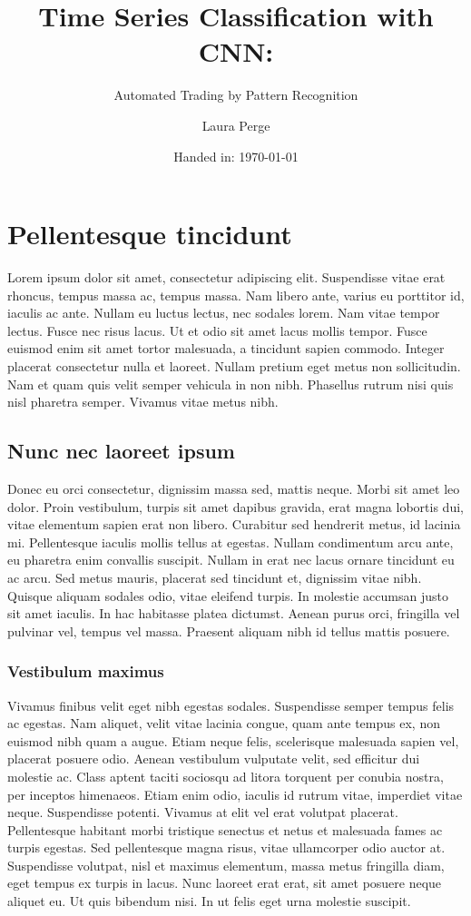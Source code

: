 \documentclass[11pt, a4paper]{article}
\author{Laura Perge}
\title{Time Series Classification with CNN:}
\subtitle{ Automated Trading by Pattern Recognition} %
\date{Handed in: \today}
\begin{document}
\maketitle

\tableofcontents

\section{Pellentesque tincidunt}
Lorem ipsum dolor sit amet, consectetur adipiscing elit. Suspendisse vitae erat rhoncus, tempus massa ac, tempus massa. Nam libero ante, varius eu porttitor id, iaculis ac ante. Nullam eu luctus lectus, nec sodales lorem. Nam vitae tempor lectus. Fusce nec risus lacus. Ut et odio sit amet lacus mollis tempor. Fusce euismod enim sit amet tortor malesuada, a tincidunt sapien commodo. Integer placerat consectetur nulla et laoreet. Nullam pretium eget metus non sollicitudin. Nam et quam quis velit semper vehicula in non nibh. Phasellus rutrum nisi quis nisl pharetra semper. Vivamus vitae metus nibh.

\subsection{Nunc nec laoreet ipsum}
Donec eu orci consectetur, dignissim massa sed, mattis neque. Morbi sit amet leo dolor. Proin vestibulum, turpis sit amet dapibus gravida, erat magna lobortis dui, vitae elementum sapien erat non libero. Curabitur sed hendrerit metus, id lacinia mi. Pellentesque iaculis mollis tellus at egestas. Nullam condimentum arcu ante, eu pharetra enim convallis suscipit. Nullam in erat nec lacus ornare tincidunt eu ac arcu. Sed metus mauris, placerat sed tincidunt et, dignissim vitae nibh. Quisque aliquam sodales odio, vitae eleifend turpis. In molestie accumsan justo sit amet iaculis. In hac habitasse platea dictumst. Aenean purus orci, fringilla vel pulvinar vel, tempus vel massa. Praesent aliquam nibh id tellus mattis posuere.

\subsubsection{Vestibulum maximus}
Vivamus finibus velit eget nibh egestas sodales. Suspendisse semper tempus felis ac egestas. Nam aliquet, velit vitae lacinia congue, quam ante tempus ex, non euismod nibh quam a augue. Etiam neque felis, scelerisque malesuada sapien vel, placerat posuere odio. Aenean vestibulum vulputate velit, sed efficitur dui molestie ac. Class aptent taciti sociosqu ad litora torquent per conubia nostra, per inceptos himenaeos. Etiam enim odio, iaculis id rutrum vitae, imperdiet vitae neque. Suspendisse potenti. Vivamus at elit vel erat volutpat placerat. Pellentesque habitant morbi tristique senectus et netus et malesuada fames ac turpis egestas. Sed pellentesque magna risus, vitae ullamcorper odio auctor at. Suspendisse volutpat, nisl et maximus elementum, massa metus fringilla diam, eget tempus ex turpis in lacus. Nunc laoreet erat erat, sit amet posuere neque aliquet eu. Ut quis bibendum nisi. In ut felis eget urna molestie suscipit.
\end{document}
